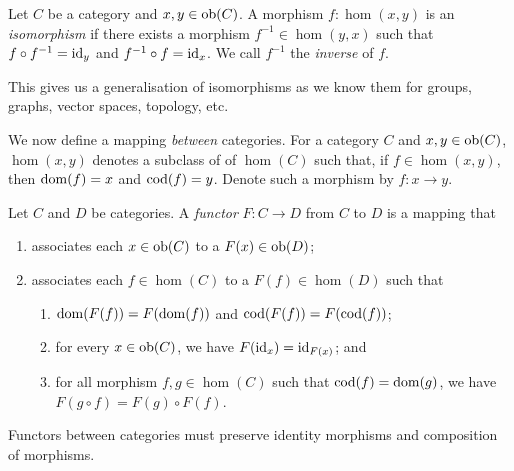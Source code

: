 \begin{definition}[Isomorphism]
    Let $C$ be a category and $x,y \in \operatorname{ob}(C)$. A morphism $f: \hom(x, y)$ is an \emph{isomorphism} if there exists a morphism $f^{-1} \in \hom(y, x)$ such that $f \circ f^{-1} = \operatorname{id}_y$ and $f^{-1} \circ f = \operatorname{id}_x$. We call $f^{-1}$ the \emph{inverse} of $f$.
\end{definition}

This gives us a generalisation of isomorphisms as we know them for groups, graphs, vector spaces, topology, etc.

We now define a mapping \emph{between} categories. For a category $C$ and $x,y \in \operatorname{ob}(C)$, $\hom(x, y)$ denotes a subclass of of $\hom(C)$ such that, if $f \in \hom(x,y)$, then $\operatorname{dom}(f) = x$ and $\operatorname{cod}(f) = y$. Denote such a morphism by $f: x \to y$.

\begin{definition}[Functor]
    Let $C$ and $D$ be categories. A \emph{functor} $F: C \to D$ from $C$ to $D$ is a mapping that
    \begin{enumerate}
        \item associates each $x \in \operatorname{ob}(C)$ to a $F(x) \in \operatorname{ob}(D)$;
        \item associates each $f \in \hom(C)$ to a $F(f) \in \hom(D)$ such that
              \begin{enumerate}
                  \item $\operatorname{dom}(F(f)) = F(\operatorname{dom}(f))$ and $\operatorname{cod}(F(f)) = F(\operatorname{cod}(f))$;
                  \item for every $x \in \operatorname{ob}(C)$, we have $F(\operatorname{id}_x) = \operatorname{id}_{F(x)}$; and
                  \item for all morphism $f, g \in \hom(C)$ such that $\operatorname{cod}(f) = \operatorname{dom}(g)$, we have $F(g \circ f) = F(g) \circ F(f)$.
              \end{enumerate}
    \end{enumerate}
\end{definition}

Functors between categories must preserve identity morphisms and composition of morphisms.

